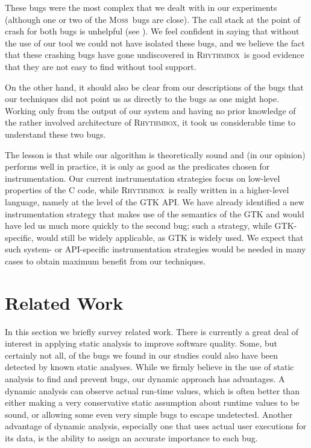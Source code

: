 \documentclass[10pt]{acmconfbig}
\newcommand{\moss}{\textsc{Moss}\xspace}
\newcommand{\rhythmbox}{\textsc{Rhythmbox}\xspace}
\begin{document}
These bugs were the most complex that we dealt with in 
our experiments (although one or two of the \moss\ bugs are close).  The
call stack at the point of crash for both bugs is unhelpful (see ).  We feel confident in saying that without the use of
our tool we could not have isolated these bugs, and we believe
 the fact that these crashing bugs have gone undiscovered in \rhythmbox\ is
good evidence that they are not easy to find without tool support.

On the other hand, it should also be clear from our descriptions of the bugs
that our techniques did not point us as directly to the bugs as one might hope.
Working only from the output of our system and having no prior knowledge of
the rather involved architecture of \rhythmbox, it took us considerable time
to understand these two bugs.  

The lesson is that while our algorithm is theoretically sound and (in
our opinion) performs well in practice, it is only as good as the
predicates chosen for instrumentation.  Our current instrumentation
strategies focus on low-level properties of the C code, while \rhythmbox\
is really written in a higher-level language, namely at the level of
the GTK API.  We have already identified a new instrumentation strategy
that makes use of the semantics of the GTK and would have led us
much more quickly to the second bug; such a strategy, while GTK-specific,
would still be widely applicable, as GTK is widely used.  We expect
that such system- or API-specific instrumentation strategies would be
needed in many cases to obtain maximum benefit from our techniques.


\section{Related Work}
\label{sec:related-work}

In this section we briefly survey related work. There is currently a great
deal of interest in applying static analysis to improve software quality.  Some,
but certainly not all, of the bugs we found in our studies could also have
been detected by known static analyses.  While we firmly believe in
the use of static analysis to find and prevent bugs, our dynamic approach has
advantages. A dynamic analysis can observe actual run-time values, which is often
better than either making a very conservative static assumption about runtime
values to be sound, or allowing some even very simple bugs to escape undetected.
Another advantage of dynamic analysis, especially one that uses actual user
executions for its data, is the ability to assign an accurate importance to each
bug.
  
\end{document}
